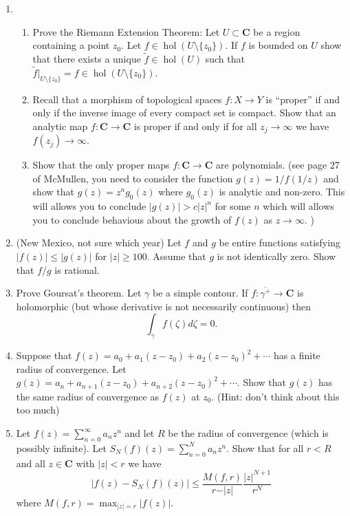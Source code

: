 \documentclass[a4paper,10pt]{article}
\newcommand{\CC}{\mathbf{C}}
\newcommand{\hol}{\operatorname{hol}}
\begin{document}
\begin{enumerate}
\item 
\begin{enumerate}
 \item Prove the Riemann Extension Theorem: Let $U\subset \CC$ be a region containing a point $z_0$. 
 Let $f \in \hol(U\setminus \lbrace z_0 \rbrace)$.
 If $f$ is bounded on $U$ show that there exists a unique $\widetilde{f} \in \hol(U)$ such that $\widetilde{f}\vert_{U \setminus \lbrace z_0 \rbrace} = f \in \hol(U \setminus \lbrace z_0 \rbrace )$.
 \item Recall that a morphism of topological spaces $f: X \to Y$ is ``proper'' if and only if the inverse image of every compact set is compact. 
 Show that an analytic map $f:\CC \to \CC$ is proper if and only if for all $z_j \to \infty$ we have $f(z_j) \to \infty$. 
 \item Show that the only proper maps $f:\CC \to \CC$ are polynomials. (see page 27 of McMullen, you need to consider the function $g(z) = 1/f(1/z)$ and show that $g(z) = z^n g_0(z)$ where $g_0(z)$ is analytic and non-zero. This will allows you to conclude $\vert g(z) \vert > c\vert z \vert^n$ for some $n$ which will allows you to conclude behavious about the growth of $f(z)$ as $z \to \infty$. )
\end{enumerate}

\item (New Mexico, not sure which year) 
Let $f$ and $g$ be entire functions satisfying $\vert f(z) \vert \leq \vert g(z) \vert$ for $\vert z \vert \geq 100$. Assume that $g$ is not identically zero. Show that $f/g$ is rational. 

\item Prove Goursat's theorem. Let $\gamma$ be a simple contour. If $f:\overline{\gamma^+} \to \CC$ is holomorphic (but whose derivative is not necessarily continuous) then 
 $$ \int_{\gamma} f(\zeta) d\zeta = 0. $$

\item Suppose that $f(z) = a_0 + a_1(z-z_0) + a_2 (z-z_0)^2 + \cdots$ has a finite radius of convergence. 
Let $g(z) = a_n+ a_{n+1} (z-z_0) + a_{n+2}(z-z_0)^2 + \cdots$. Show that $g(z)$ has the same radius of convergence as $f(z)$ at $z_0$. (Hint: don't think about this too much)

\item Let $f(z) = \sum_{n=0}^{\infty}a_nz^n$ and let $R$ be the radius of convergence (which is possibly infinite). Let $S_N(f)(z) = \sum_{n=0}^N a_n z^n$. 
Show that for all $r<R$ and all $z \in \CC$ with $\vert z \vert < r$ we have 
 $$ \vert f(z) - S_N(f)(z) \vert \leq \frac{M(f,r)}{r - \vert z \vert} \frac{\vert z \vert^{N+1}}{r^{N}} $$ 
where $ M(f,r) = \max_{\vert z \vert = r} \vert f(z) \vert. $


\end{enumerate}
\end{document}
